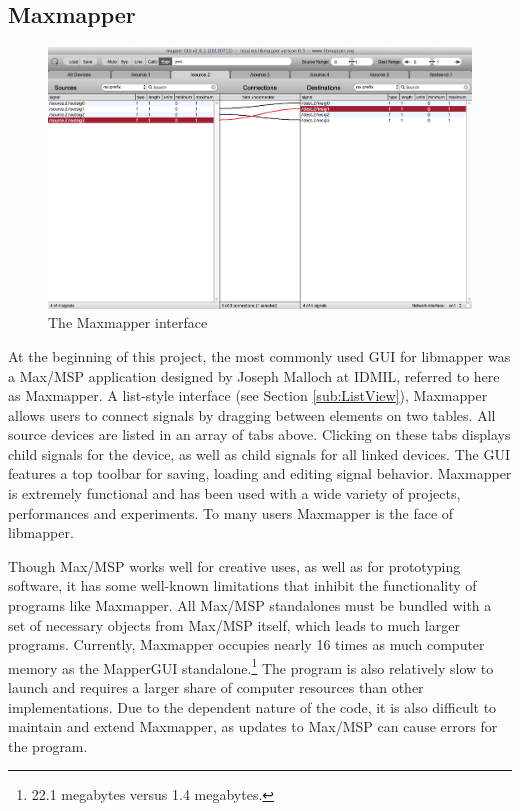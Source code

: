 	\subsection{Maxmapper} %
	\label{sub:maxmapper}

\begin{figure}[ht]
	\centering
	\includegraphics[width=\textwidth]{figures/maxmapper}
	\caption{The Maxmapper interface}
	\label{fig:maxmapper}
\end{figure}

At the beginning of this project, the most commonly used GUI for libmapper was a Max/MSP application designed by Joseph Malloch at IDMIL, referred to here as Maxmapper. A list-style interface (see Section \ref{sub:ListView}), Maxmapper allows users to connect signals by dragging between elements on two tables. All source devices are listed in an array of tabs above. Clicking on these tabs displays child signals for the device, as well as child signals for all linked devices. The GUI features a top toolbar for saving, loading and editing signal behavior. Maxmapper is extremely functional and has been used with a wide variety of projects, performances and experiments. To many users Maxmapper is the face of libmapper.
	
Though Max/MSP works well for creative uses, as well as for prototyping software, it has some well-known limitations that inhibit the functionality of programs like Maxmapper. All Max/MSP standalones must be bundled with a set of necessary objects from Max/MSP itself, which leads to much larger programs. Currently, Maxmapper occupies nearly 16 times as much computer memory as the MapperGUI standalone.\footnote{22.1 megabytes versus 1.4 megabytes.} The program is also relatively slow to launch and requires a larger share of computer resources than other implementations. Due to the dependent nature of the code, it is also difficult to maintain and extend Maxmapper, as updates to Max/MSP can cause errors for the program.

